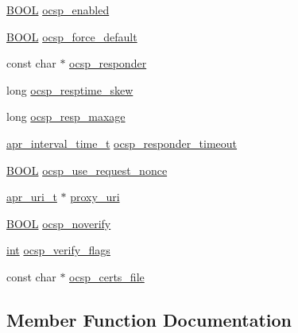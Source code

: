 \begin{DoxyCompactItemize}
\item 
\hyperlink{pcre__internal_8h_a050c65e107f0c828f856a231f4b4e788}{B\+O\+OL} \hyperlink{structmodssl__ctx__t_a9a3bce44f2aabbfeda02bc01ee0f9d51}{ocsp\+\_\+enabled}
\item 
\hyperlink{pcre__internal_8h_a050c65e107f0c828f856a231f4b4e788}{B\+O\+OL} \hyperlink{structmodssl__ctx__t_a255e990e5c605d18b841654f81e55dc5}{ocsp\+\_\+force\+\_\+default}
\item 
const char $\ast$ \hyperlink{structmodssl__ctx__t_a2a2c18138088728ac3e2c6bcd730d6f2}{ocsp\+\_\+responder}
\item 
long \hyperlink{structmodssl__ctx__t_a5cdc0a59be9ce5e162c2e6d43dec6a5e}{ocsp\+\_\+resptime\+\_\+skew}
\item 
long \hyperlink{structmodssl__ctx__t_a06884a7ec01cd352bff2d8b275eff03a}{ocsp\+\_\+resp\+\_\+maxage}
\item 
\hyperlink{group__apr__time_gaae2129185a395cc393f76fabf4f43e47}{apr\+\_\+interval\+\_\+time\+\_\+t} \hyperlink{structmodssl__ctx__t_af961798cf6655359f7e59d713f1ca55e}{ocsp\+\_\+responder\+\_\+timeout}
\item 
\hyperlink{pcre__internal_8h_a050c65e107f0c828f856a231f4b4e788}{B\+O\+OL} \hyperlink{structmodssl__ctx__t_aa1d52b3a4efb74a834bee934f88d6d48}{ocsp\+\_\+use\+\_\+request\+\_\+nonce}
\item 
\hyperlink{structapr__uri__t}{apr\+\_\+uri\+\_\+t} $\ast$ \hyperlink{structmodssl__ctx__t_afdef1c118903213371baf62c899ca028}{proxy\+\_\+uri}
\item 
\hyperlink{pcre__internal_8h_a050c65e107f0c828f856a231f4b4e788}{B\+O\+OL} \hyperlink{structmodssl__ctx__t_aa57b3194dda4815e8ffe41cb291f5b37}{ocsp\+\_\+noverify}
\item 
\hyperlink{pcre_8txt_a42dfa4ff673c82d8efe7144098fbc198}{int} \hyperlink{structmodssl__ctx__t_a9d0a77e4a5041249f30ce3f7fc4187ca}{ocsp\+\_\+verify\+\_\+flags}
\item 
const char $\ast$ \hyperlink{structmodssl__ctx__t_ab9a17529e353f5a2786b7c9af8641bbe}{ocsp\+\_\+certs\+\_\+file}
\end{DoxyCompactItemize}


\subsection{Member Function Documentation}
